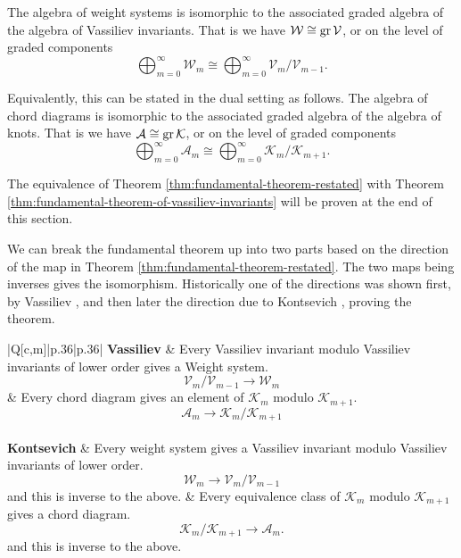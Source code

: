 \begin{theorem}
	\label{thm:fundamental-theorem-restated}
	The algebra of weight systems is isomorphic to the associated graded algebra of the algebra of Vassiliev invariants. That is we have \(\mathcal{W} \cong \operatorname{gr} \mathcal{V}\), or on the level of graded components
	\[\bigoplus_{m = 0}^{\infty} \mathcal{W}_{m} \cong \bigoplus_{m = 0}^{\infty} \mathcal{V}_{m} / \mathcal{V}_{m - 1}.\]

	Equivalently, this can be stated in the dual setting as follows. The algebra of chord diagrams is isomorphic to the associated graded algebra of the algebra of knots. That is we have \(\mathcal{A} \cong \operatorname{gr} \mathcal{K}\), or on the level of graded components
	\[\bigoplus_{m = 0}^{\infty} \mathcal{A}_{m} \cong \bigoplus_{m = 0}^{\infty} \mathcal{K}_{m} / \mathcal{K}_{m + 1}.\]
\end{theorem}

The equivalence of Theorem \ref{thm:fundamental-theorem-restated} with Theorem \ref{thm:fundamental-theorem-of-vassiliev-invariants} will be proven at the end of this section.

We can break the fundamental theorem up into two parts based on the direction of the map in Theorem \ref{thm:fundamental-theorem-restated}. The two maps being inverses gives the isomorphism. Historically one of the directions was shown first, by Vassiliev \cite{cohomology-of-knot-spaces, complements-of-discriminants-of-smooth-maps-topology-and-applications}, and then later the direction due to Kontsevich \cite{vassilievs-knot-invariants}, proving the theorem.

\begin{center}
	\begin{tblr}{|Q[c,m]|p{.36\textwidth}|p{.36\textwidth}|}
		\hline
		\textbf{Vassiliev}
		& Every Vassiliev invariant modulo Vassiliev invariants of lower order gives a Weight system. \[\mathcal{V}_{m} / \mathcal{V}_{m - 1} \to \mathcal{W}_{m}\] \vspace{-20pt}
		& Every chord diagram gives an element of \(\mathcal{K}_{m}\) modulo \(\mathcal{K}_{m + 1}\). \[\mathcal{A}_{m} \to \mathcal{K}_{m} / \mathcal{K}_{m + 1}\] \vspace{-20pt} \\ \hline
		\textbf{Kontsevich}
		& Every weight system gives a Vassiliev invariant modulo Vassiliev invariants of lower order. \[\mathcal{W}_{m} \to \mathcal{V}_{m} / \mathcal{V}_{m - 1}\] and this is inverse to the above.
		& Every equivalence class of \(\mathcal{K}_{m}\) modulo \(\mathcal{K}_{m + 1}\) gives a chord diagram. \[\mathcal{K}_{m} / \mathcal{K}_{m + 1} \to \mathcal{A}_{m}.\] and this is inverse to the above. \\ \hline
	\end{tblr}
\end{center}

